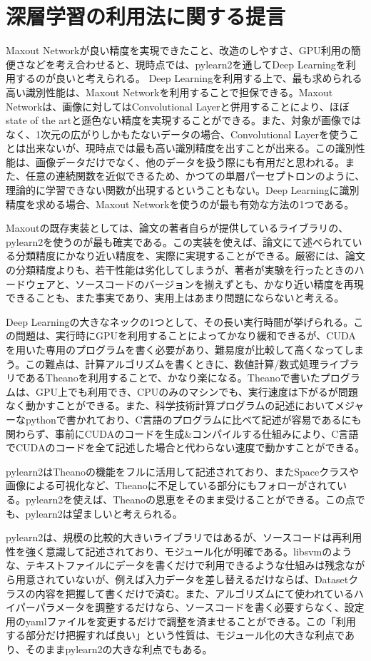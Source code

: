 \section{深層学習の利用法に関する提言}
Maxout Networkが良い精度を実現できたこと、改造のしやすさ、GPU利用の簡便さなどを考え合わせると、現時点では、pylearn2を通してDeep Learningを利用するのが良いと考えられる。
Deep Learningを利用する上で、最も求められる高い識別性能は、Maxout Networkを利用することで担保できる。Maxout Networkは、画像に対してはConvolutional Layerと併用することにより、ほぼstate of the artと遜色ない精度を実現することができる。また、対象が画像ではなく、1次元の広がりしかもたないデータの場合、Convolutional Layerを使うことは出来ないが、現時点では最も高い識別精度を出すことが出来る。この識別性能は、画像データだけでなく、他のデータを扱う際にも有用だと思われる。また、任意の連続関数を近似できるため、かつての単層パーセプトロンのように、理論的に学習できない関数が出現するということもない。Deep Learningに識別精度を求める場合、Maxout Networkを使うのが最も有効な方法の1つである。\par
Maxoutの既存実装としては、論文の著者自らが提供しているライブラリの、pylearn2を使うのが最も確実である。この実装を使えば、論文にて述べられている分類精度にかなり近い精度を、実際に実現することができる。厳密には、論文の分類精度よりも、若干性能は劣化してしまうが、著者が実験を行ったときのハードウェアと、ソースコードのバージョンを揃えずとも、かなり近い精度を再現できることも、また事実であり、実用上はあまり問題にならないと考える。\par
Deep Learningの大きなネックの1つとして、その長い実行時間が挙げられる。この問題は、実行時にGPUを利用することによってかなり緩和できるが、CUDAを用いた専用のプログラムを書く必要があり、難易度が比較して高くなってしまう。この難点は、計算アルゴリズムを書くときに、数値計算/数式処理ライブラリであるTheanoを利用することで、かなり楽になる。Theanoで書いたプログラムは、GPU上でも利用でき、CPUのみのマシンでも、実行速度は下がるが問題なく動かすことができる。また、科学技術計算プログラムの記述においてメジャーなpythonで書かれており、C言語のプログラムに比べて記述が容易であるにも関わらず、事前にCUDAのコードを生成\&コンパイルする仕組みにより、C言語でCUDAのコードを全て記述した場合と代わらない速度で動かすことができる。\par
pylearn2はTheanoの機能をフルに活用して記述されており、またSpaceクラスや画像による可視化など、Theanoに不足している部分にもフォローがされている。pylearn2を使えば、Theanoの恩恵をそのまま受けることができる。この点でも、pylearn2は望ましいと考えられる。\par
pylearn2は、規模の比較的大きいライブラリではあるが、ソースコードは再利用性を強く意識して記述されており、モジュール化が明確である。libsvmのような、テキストファイルにデータを書くだけで利用できるような仕組みは残念ながら用意されていないが、例えば入力データを差し替えるだけならば、Datasetクラスの内容を把握して書くだけで済む。また、アルゴリズムにて使われているハイパーパラメータを調整するだけなら、ソースコードを書く必要すらなく、設定用のyamlファイルを変更するだけで調整を済ませることができる。この「利用する部分だけ把握すれば良い」という性質は、モジュール化の大きな利点であり、そのままpylearn2の大きな利点でもある。